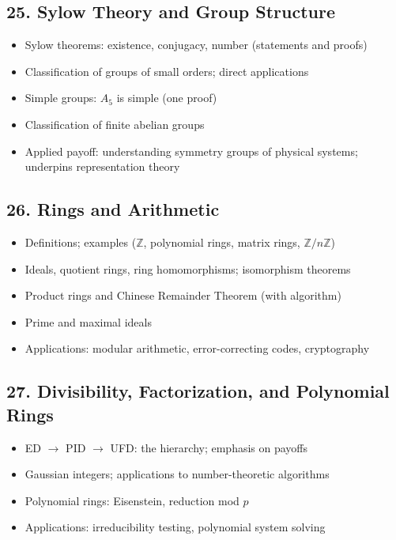 \subsection{25. Sylow Theory and Group Structure}
\begin{itemize}
\item Sylow theorems: existence, conjugacy, number (statements and proofs)
\item Classification of groups of small orders; direct applications
\item Simple groups: $A_5$ is simple (one proof)
\item Classification of finite abelian groups
\item Applied payoff: understanding symmetry groups of physical systems; underpins representation theory
\end{itemize}

\subsection{26. Rings and Arithmetic}
\begin{itemize}
\item Definitions; examples ($\mathbb{Z}$, polynomial rings, matrix rings, $\mathbb{Z}/n\mathbb{Z}$)
\item Ideals, quotient rings, ring homomorphisms; isomorphism theorems
\item Product rings and Chinese Remainder Theorem (with algorithm)
\item Prime and maximal ideals
\item Applications: modular arithmetic, error-correcting codes, cryptography
\end{itemize}

\subsection{27. Divisibility, Factorization, and Polynomial Rings}
\begin{itemize}
\item ED $\to$ PID $\to$ UFD: the hierarchy; emphasis on payoffs
\item Gaussian integers; applications to number-theoretic algorithms
\item Polynomial rings: Eisenstein, reduction mod $p$
\item Applications: irreducibility testing, polynomial system solving
\end{itemize}

